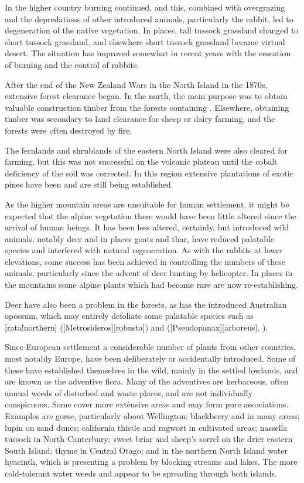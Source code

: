 In the higher country burning continued, and this, combined with overgrazing and the depredations of other introduced animals, particularly the rabbit, led to degeneration of the native vegetation.
In places, tall tussock grassland changed to short tussock grassland, and elsewhere short tussock grassland became virtual desert.
The situation has improved somewhat in recent years with the cessation of burning and the control of rabbits.

After the end of the New Zealand Wars in the North Island in the 1870s, extensive forest clearance began.
In the north, the main purpose was to obtain valuable construction timber from the forests containing .
Elsewhere, obtaining timber was secondary to land clearance for sheep or dairy farming, and the forests were often destroyed by fire.

The fernlands and shrublands of the eastern North Island were also cleared for farming, but this was not successful on the volcanic plateau until the cobalt deficiency of the soil was corrected.
In this region extensive plantations of exotic pines have been and are still being established.

As the higher mountain areas are unsuitable for human settlement, it might be expected that the alpine vegetation there would have been little altered since the arrival of human beings.
It has been less altered, certainly, but introduced wild animals, notably deer and in places goats and thar, have reduced palatable species and interfered with natural regeneration.
As with the rabbits at lower elevations, some success has been achieved in controlling the numbers of these animals, particularly since the advent of deer hunting by helicopter.
In places in the mountains some alpine plants which had become rare are now re-establishing.

Deer have also been a problem in the forests, as has the introduced Australian opossum, which may entirely defoliate some palatable species such as [rata!northern] ([Metrosideros][robusta]) and  ([Pseudopanax][arboreus], ).

Since European settlement a considerable number of plants from other countries, most notably Europe, have been deliberately or accidentally introduced.
Some of these have established themselves in the wild, mainly in the settled lowlands, and are known as the adventive flora.
Many of the adventives are herbaceous, often annual weeds of disturbed and waste places, and are not individually conspicuous.
Some cover more extènsive areas and may form pure associations.
Examples are gorse, particularly about Wellington; blackberry and  in many areas; lupin on sand dunes; california thistle and ragwort in cultivated areas; nassella tussock in North Canterbury; sweet briar and sheep's sorrel on the drier eastern South Island; thyme in Central Otago; and in the northern North Island water hyacinth, which is presenting a problem by blocking streams and lakes.
The more cold-tolerant water weeds  and  appear to be spreading through both islands.

